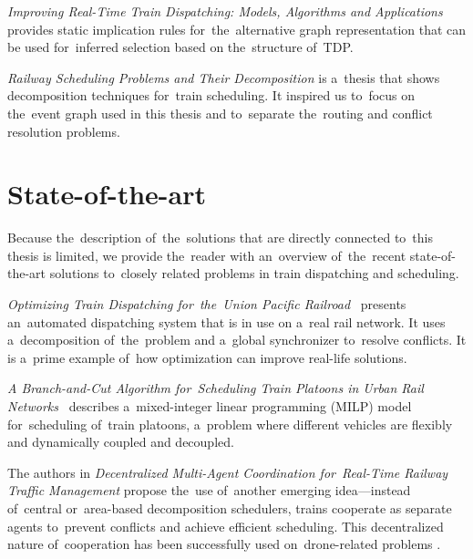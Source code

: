 \emph{Improving Real-Time Train Dispatching: Models, Algorithms and Applications} \cite{dariano2008improving} provides static implication rules for~the~alternative graph representation that can be used for~inferred selection based on the~structure of~TDP.

\begin{minipage}{\textwidth}
\emph{Railway Scheduling Problems and Their Decomposition} \cite{Strotmann2007} is a~thesis that shows decomposition techniques for~train scheduling. It inspired us to~focus on the~event graph used in this thesis and to~separate the~routing and conflict resolution problems.	
\end{minipage}

\section{State-of-the-art}
Because the~description of~the~solutions that are directly connected to~this thesis is limited, we provide the~reader with an~overview of~the~recent state-of-the-art solutions to~closely related problems in train dispatching and scheduling.

\emph{Optimizing Train Dispatching for~the~Union Pacific Railroad}~\cite{boccia2025optimizing} presents an~automated dispatching system that is in use on a~real rail network. It uses a~decomposition of~the~problem and a~global synchronizer to~resolve conflicts. It is a~prime example of~how optimization can improve real-life solutions.

\emph{A Branch-and-Cut Algorithm for~Scheduling Train Platoons in Urban Rail Networks}~\cite{chai2024branch} describes a~mixed-integer linear programming (MILP) model for~scheduling of~train platoons, a~problem where different vehicles are flexibly and dynamically coupled and decoupled.

The authors in \emph{Decentralized Multi-Agent Coordination for~Real-Time Railway Traffic Management} \cite{damato2025decentralised} propose the~use of~another emerging idea---instead of~central or~area-based decomposition schedulers, trains cooperate as separate agents to~prevent conflicts and achieve efficient scheduling. This decentralized nature of~cooperation has been successfully used on~drone-related problems \cite{HertJINTHW_paper}.


